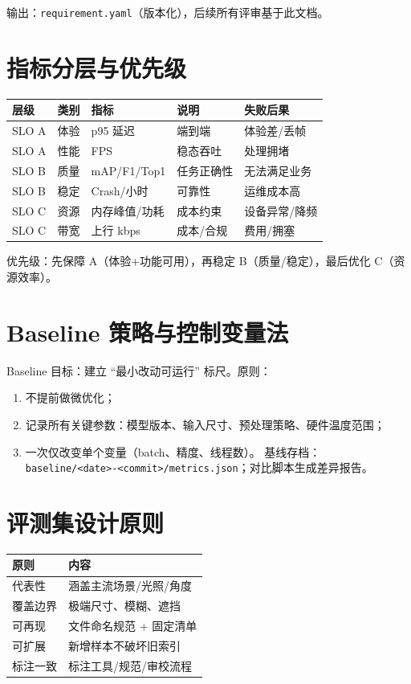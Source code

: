 输出：\passthrough{\lstinline!requirement.yaml!}（版本化），后续所有评审基于此文档。

\section{指标分层与优先级}\label{src-book-chapter10-h3}

\begin{longtable}[]{@{}lllll@{}}
\toprule\noalign{}
层级 & 类别 & 指标 & 说明 & 失败后果 \\
\midrule\noalign{}
\endhead
\bottomrule\noalign{}
\endlastfoot
SLO A & 体验 & p95 延迟 & 端到端 & 体验差/丢帧 \\
SLO A & 性能 & FPS & 稳态吞吐 & 处理拥堵 \\
SLO B & 质量 & mAP/F1/Top1 & 任务正确性 & 无法满足业务 \\
SLO B & 稳定 & Crash/小时 & 可靠性 & 运维成本高 \\
SLO C & 资源 & 内存峰值/功耗 & 成本约束 & 设备异常/降频 \\
SLO C & 带宽 & 上行 kbps & 成本/合规 & 费用/拥塞 \\
\end{longtable}

优先级：先保障 A（体验+功能可用），再稳定 B（质量/稳定），最后优化
C（资源效率）。

\section{Baseline 策略与控制变量法}\label{src-book-chapter10-h4}

Baseline 目标：建立 ``最小改动可运行'' 标尺。原则：

\begin{enumerate}
\def\labelenumi{\arabic{enumi}.}
\tightlist
\item
  不提前做微优化；
\item
  记录所有关键参数：模型版本、输入尺寸、预处理策略、硬件温度范围；
\item
  一次仅改变单个变量（batch、精度、线程数）。
  基线存档：\passthrough{\lstinline!baseline/<date>-<commit>/metrics.json!}；对比脚本生成差异报告。
\end{enumerate}

\section{评测集设计原则}\label{src-book-chapter10-h5}

\begin{longtable}[]{@{}ll@{}}
\toprule\noalign{}
原则 & 内容 \\
\midrule\noalign{}
\endhead
\bottomrule\noalign{}
\endlastfoot
代表性 & 涵盖主流场景/光照/角度 \\
覆盖边界 & 极端尺寸、模糊、遮挡 \\
可再现 & 文件命名规范 + 固定清单 \\
可扩展 & 新增样本不破坏旧索引 \\
标注一致 & 标注工具/规范/审校流程 \\
\end{longtable}

